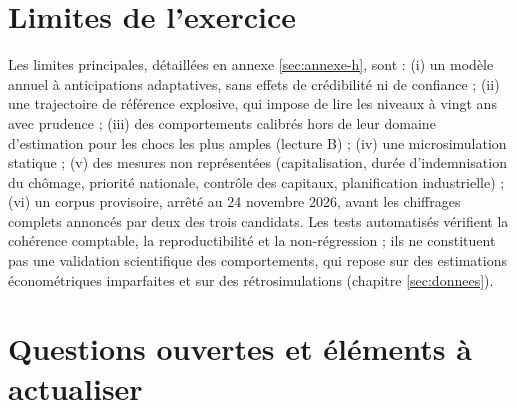\documentclass[
  11pt,
  11pt,
  a4paper,
  openany]{book}
\begin{document}
\hypertarget{sec:limites-conclusion}{%
\section{Limites de l'exercice}\label{sec:limites-conclusion}}

Les limites principales, détaillées en annexe \ref{sec:annexe-h}, sont :
(i) un modèle annuel à anticipations adaptatives, sans effets de
crédibilité ni de confiance ; (ii) une trajectoire de référence
explosive, qui impose de lire les niveaux à vingt ans avec prudence ;
(iii) des comportements calibrés hors de leur domaine d'estimation pour
les chocs les plus amples (lecture B) ; (iv) une microsimulation
statique ; (v) des mesures non représentées (capitalisation, durée
d'indemnisation du chômage, priorité nationale, contrôle des capitaux,
planification industrielle) ; (vi) un corpus provisoire, arrêté au 24
novembre 2026, avant les chiffrages complets annoncés par deux des trois
candidats. Les tests automatisés vérifient la cohérence comptable, la
reproductibilité et la non-régression ; ils ne constituent pas une
validation scientifique des comportements, qui repose sur des
estimations économétriques imparfaites et sur des rétrosimulations
(chapitre \ref{sec:donnees}).

\hypertarget{sec:questions-ouvertes}{%
\section{Questions ouvertes et éléments à
actualiser}\label{sec:questions-ouvertes}}
\end{document}
